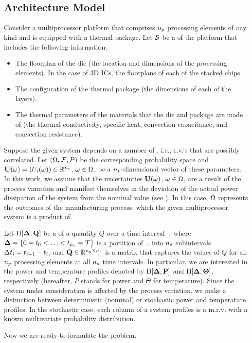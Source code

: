 \subsection{Architecture Model}  
Consider a multiprocessor platform that comprises ${n_p}$ processing elements of any kind and is equipped with a thermal package. Let $\mathcal{S}$ be a  of the platform that includes the following information:
\begin{itemize}
  \item The floorplan of the die (the location and dimensions of the processing elements). In the case of 3D ICs, the floorplans of each of the stacked chips.
  \item The configuration of the thermal package (the dimensions of each of the layers).
  \item The thermal parameters of the materials that the die and package are made of (the thermal conductivity, specific heat, convection capacitance, and convection resistance).
\end{itemize}

Suppose the given system depends on a number of , i.e., r.v.'s that are possibly correlated. Let $(\Omega, \mathcal{F}, P)$ be the corresponding probability space and $\vU(\o) = \vec{\param_i(\o)} \in \real^\vars$, $\omega \in \Omega$, be a ${n_v}$-dimensional vector of these parameters. In this work, we assume that the uncertainties $\vU(\o)$, $\omega \in \Omega$, are a result of the process variation and manifest themselves in the deviation of the actual power dissipation of the system from the nominal value (see ). In this case, $\Omega$ represents the outcomes of the manufacturing process, which the given multiprocessor system is a product of.

Let $\prof{\m{Q}}$ be a  of a quantity $Q$ over a time interval $\period$ where $\boldsymbol{\Delta} = \{ 0 = t_0 < \dotsc < t_{{n_s}} = \mathcal{T} \}$ is a partition of $\period$ into ${n_s}$ subintervals $\Delta t_i = t_{i+1} - t_i$, and $\m{Q} \in \real^{\cores \times \steps}$ is a matrix that captures the values of $Q$ for all ${n_p}$ processing elements at all ${n_s}$ time intervals. In particular, we are interested in the power and temperature profiles denoted by $\prof{\mP}$ and $\Pi[\boldsymbol{\Delta}, {\boldsymbol\Theta}]$, respectively (hereafter, $P$ stands for power and $\Theta$ for temperature). Since the system under consideration is affected by the process variation, we make a distinction between deterministic (nominal) or stochastic power and temperature profiles. In the stochastic case, each column of a system profiles is a m.r.v. with a known multivariate probability distribution.

Now we are ready to formulate the problem.
